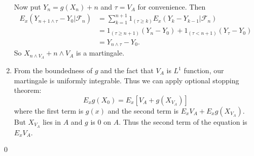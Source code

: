 \begin{problem}[5.2.11]
\begin{enumerate}
			Now put $Y_n = g(X_n) + n$ and $\tau = V_A$ for convenience.
			Then
			\[
				\begin{split}
					E_x \left( Y_{n+1 \wedge \tau} -Y_0\lvert \mathcal{F}_n \right)
					&= \sum_{k=1}^{n+1} 1_{(\tau \geq k)}E_x\left( Y_k - Y_{k-1} \lvert \mathcal{F}_n \right) \\
					&= 1_{(\tau \geq n+1)}(Y_n - Y_0) + 1_{(\tau < n+1)}(Y_\tau - Y_0) \\
					&= Y_{n\wedge \tau} - Y_0.
				\end{split}
			\]
			So $X_{n\wedge V_A} + n\wedge V_A$ is a martingale.

		\item From the boundedness of $g$ and the fact that $V_A$ is $L^1$ function, our martingale is uniformly integrable.
			Thus we can apply optional stopping theorem:
			\[
				E_x g(X_0) = E_x \left[ V_A + g(X_{V_A}) \right]
			\]
			where the first term is $g(x)$ and the second term is $E_x V_A + E_x g(X_{V_A})$.
			But $X_{V_A}$ lies in $A$ and $g$ is 0 on $A$.
			Thus the second term of the equation is $E_x V_A$.
	\end{enumerate}
	\qed
\end{problem}
